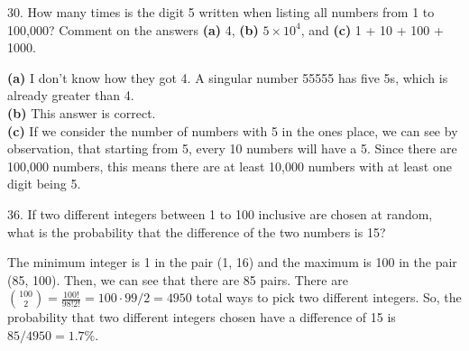 \documentclass[12pt]{article}
\begin{document}
30. How many times is the digit 5 written when listing all numbers
from 1 to 100,000? Comment on the answers \textbf{(a)} 4, \textbf{(b)} 
$5\times10^4$, and \textbf{(c)} 1 + 10 + 100 + 1000. 
\begin{solution}
    \textbf{(a)} I don't know how they got 4. A singular number 
    55555 has five 5s, which is already greater than 4. \\
    \textbf{(b)} This answer is correct. \\
    \textbf{(c)} If we consider the number of numbers with 5 in 
    the ones place, we can see by observation, that starting from 5, 
    every 10 numbers will have a 5. Since there are 100,000 numbers, 
    this means there are at least 10,000 numbers with at least one 
    digit being 5. 
\end{solution}

36. If two different integers between 1 to 100 inclusive are chosen
at random, what is the probability that the difference of the two 
numbers is 15? 
\begin{solution}
    The minimum integer is 1 in the pair (1, 16) and the maximum is 
    100 in the pair (85, 100). Then, we can see that there are 85 
    pairs. There are $\binom{100}{2}=\frac{100!}{98!2!}=100\cdot99/2
    =4950$ total ways to pick two different integers. So, the 
    probability that two different integers chosen have a difference
    of 15 is $85/4950 = 1.7\%$. 
\end{solution}
\end{document}
